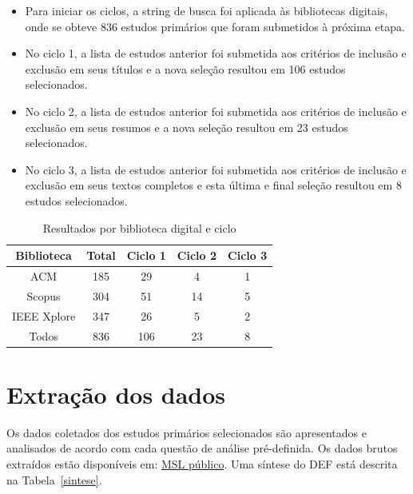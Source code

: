 \documentclass[
	12pt,
	openright,
	twoside,
	a4paper,
	english,
	brazil
	]{abntex2}
\begin{document}
\begin{itemize}
  \item Para iniciar os ciclos, a string de busca foi aplicada às bibliotecas digitais, onde se obteve 836 estudos primários que foram submetidos à próxima etapa.
  \item No ciclo 1, a lista de estudos anterior foi submetida aos critérios de inclusão e exclusão em seus títulos e a nova seleção resultou em 106 estudos selecionados.
  \item No ciclo 2, a lista de estudos anterior foi submetida aos critérios de inclusão e exclusão em seus resumos e a nova seleção resultou em 23 estudos selecionados.
  \item No ciclo 3, a lista de estudos anterior foi submetida aos critérios de inclusão e exclusão em seus textos completos e esta última e final seleção resultou em 8 estudos selecionados.
\end{itemize}

\begin{table}[h!]
  \centering
  \caption{Resultados por biblioteca digital e ciclo}
  \begin{tabular}{|c|c|c|c|c|}
  \hline
  \textbf{Biblioteca} & \textbf{Total} & \textbf{Ciclo 1} & \textbf{Ciclo 2} & \textbf{Ciclo 3} \\ \hline
  ACM & 185 & 29 & 4 & 1 \\ \hline
  Scopus & 304 & 51 & 14 & 5 \\ \hline
  IEEE Xplore & 347 & 26 & 5 & 2 \\ \hline
  Todos & 836 & 106 & 23 & 8 \\ \hline
  \end{tabular}
\end{table}
  

\section{Extração dos dados}

Os dados coletados dos estudos primários selecionados são apresentados e analisados de acordo com cada questão de análise pré-definida. Os dados brutos extraídos estão disponíveis em: \href{https://docs.google.com/spreadsheets/d/1YY_yjyBefJ3ZmnEY38TM_LnZLoJcKhrw_q0BdEvqx2E/edit?gid=1276800509#gid=1276800509}{MSL público}. Uma síntese do DEF está descrita na Tabela~\ref{sintese}.
\end{document}
